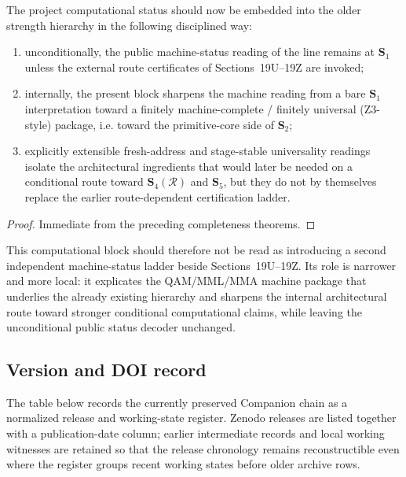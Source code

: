 \begin{corollary}\label{cor:computational-status-upgrade-rule-computational-layer}
The project computational status should now be embedded into the older strength hierarchy in the following disciplined way:
\begin{enumerate}[leftmargin=2em]
    \item unconditionally, the public machine-status reading of the line remains at \(\mathbf S_1\) unless the external route certificates of Sections~19U--19Z are invoked;
    \item internally, the present block sharpens the machine reading from a bare \(\mathbf S_1\) interpretation toward a finitely machine-complete / finitely universal (Z3-style) package, i.e. toward the primitive-core side of \(\mathbf S_2\);
    \item explicitly extensible fresh-address and stage-stable universality readings isolate the architectural ingredients that would later be needed on a conditional route toward \(\mathbf S_4(\mathcal R)\) and \(\mathbf S_5\), but they do not by themselves replace the earlier route-dependent certification ladder.
\end{enumerate}
\end{corollary}

\begin{proof}
Immediate from the preceding completeness theorems.
\end{proof}

\begin{remark}\label{rem:no-parallel-machine-status-hierarchy-computational-layer}
This computational block should therefore not be read as introducing a second independent machine-status ladder beside Sections~19U--19Z. Its role is narrower and more local: it explicates the QAM/MML/MMA machine package that underlies the already existing hierarchy and sharpens the internal architectural route toward stronger conditional computational claims, while leaving the unconditional public status decoder unchanged.
\end{remark}

\subsection*{Version and DOI record}
The table below records the currently preserved Companion chain as a normalized release and working-state register. Zenodo releases are listed together with a publication-date column; earlier intermediate records and local working witnesses are retained so that the release chronology remains reconstructible even where the register groups recent working states before older archive rows.

